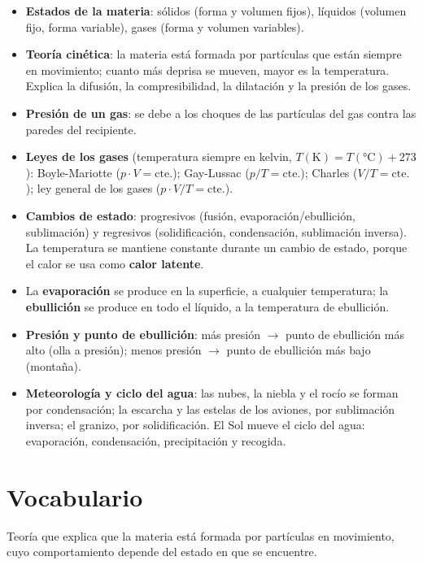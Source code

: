 \begin{itemize}
    \item \textbf{Estados de la materia}: sólidos (forma y volumen fijos), líquidos (volumen fijo, forma variable), gases (forma y volumen variables).
    \item \textbf{Teoría cinética}: la materia está formada por partículas que están siempre en movimiento; cuanto más deprisa se mueven, mayor es la temperatura. Explica la difusión, la compresibilidad, la dilatación y la presión de los gases.
    \item \textbf{Presión de un gas}: se debe a los choques de las partículas del gas contra las paredes del recipiente.
    \item \textbf{Leyes de los gases} (temperatura siempre en kelvin, \(T(\unit{\K}) = T(\unit{\celsius}) + 273\)): Boyle-Mariotte (\(p \cdot V = \text{cte.}\)); Gay-Lussac (\(p/T = \text{cte.}\)); Charles (\(V/T = \text{cte.}\)); ley general de los gases (\(p \cdot V / T = \text{cte.}\)).
    \item \textbf{Cambios de estado}: progresivos (fusión, evaporación/ebullición, sublimación) y regresivos (solidificación, condensación, sublimación inversa). La temperatura se mantiene constante durante un cambio de estado, porque el calor se usa como \textbf{calor latente}.
    \item La \textbf{evaporación} se produce en la superficie, a cualquier temperatura; la \textbf{ebullición} se produce en todo el líquido, a la temperatura de ebullición.
    \item \textbf{Presión y punto de ebullición}: más presión \(\to\) punto de ebullición más alto (olla a presión); menos presión \(\to\) punto de ebullición más bajo (montaña).
    \item \textbf{Meteorología y ciclo del agua}: las nubes, la niebla y el rocío se forman por condensación; la escarcha y las estelas de los aviones, por sublimación inversa; el granizo, por solidificación. El Sol mueve el ciclo del agua: evaporación, condensación, precipitación y recogida.
\end{itemize}

\section{Vocabulario}

\begin{vocabulary}
    Teoría que explica que la materia está formada por partículas en movimiento, cuyo comportamiento depende del estado en que se encuentre.
\end{vocabulary}

